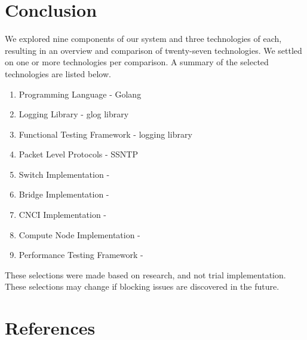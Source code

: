\documentclass[10pt,letterpaper,onecolumn,draftclsnofoot]{IEEEtran}
\begin{document}
\section{Conclusion}
We explored nine components of our system and three technologies of each,
resulting in an overview and comparison of twenty-seven technologies. We settled
on one or more technologies per comparison. A summary of the selected
technologies are listed below.

\begin{enumerate}
	\item Programming Language - Golang
	\item Logging Library - glog library
	\item Functional Testing Framework - logging library
	\item Packet Level Protocols - SSNTP
	\item Switch Implementation -
	\item Bridge Implementation -
	\item CNCI Implementation -
	\item Compute Node Implementation -
	\item Performance Testing Framework -
\end{enumerate}

These selections were made based on research, and not trial implementation.
These selections may change if blocking issues are discovered in the future.
\section{References}



\end{document}
